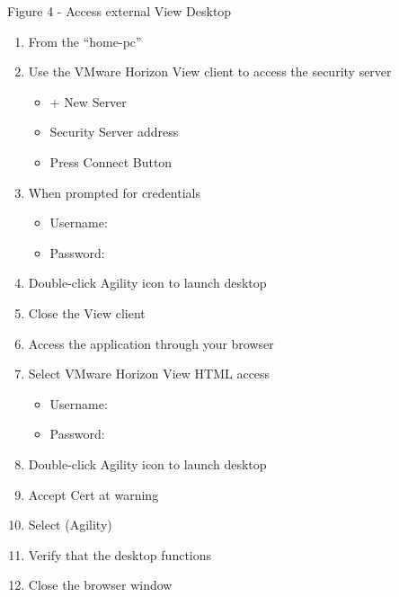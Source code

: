 \documentclass[letterpaper,10pt,english]{sphinxmanual}
\begin{document}
Figure 4 - Access external View Desktop
\begin{enumerate}
\item {} 
From the “home-pc”


\item {} 
Use the VMware Horizon View client to access the security server
\begin{itemize}
\item {} 
+ New Server

\item {} 
Security Server address 

\item {} 
Press Connect Button

\end{itemize}

\item {} 
When prompted for credentials
\begin{itemize}
\item {} 
Username: 

\item {} 
Password: 

\end{itemize}

\item {} 
Double-click Agility icon to launch desktop

\item {} 
Close the View client

\item {} 
Access the application through your browser

\item {} 
Select VMware Horizon View HTML access
\begin{itemize}
\item {} 
Username: 

\item {} 
Password: 

\end{itemize}

\item {} 
Double-click Agility icon to launch desktop

\item {} 
Accept Cert at warning

\item {} 
Select (Agility)

\item {} 
Verify that the desktop functions

\item {} 
Close the browser window

\end{enumerate}
\end{document}
